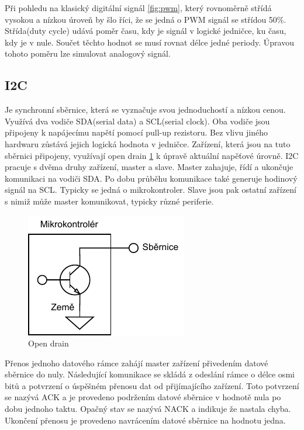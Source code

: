 Při pohledu na klasický digitální signál \ref{fig:pwm}, který rovnoměrně střídá vysokou a nízkou úroveň by šlo říci, že se jedná o PWM signál se střídou 50\%. Střída(duty cycle) udává poměr času, kdy je signál v logické jedničce, ku času, kdy je v nule. Součet těchto hodnot se musí rovnat délce jedné periody. Úpravou tohoto poměru lze simulovat analogový signál. \cite[str:~116-118]{embeded_robotics}

\newpage
\subsection*{I2C}
Je synchronní sběrnice, která se vyznačuje svou jednoduchostí a nízkou cenou. Využívá dva vodiče SDA(serial data) a SCL(serial clock). Oba vodiče jsou připojeny k napájecímu napětí pomocí pull-up rezistoru. Bez vlivu jiného hardwaru zůstává jejich logická hodnota v jedničce. Zařízení, která jsou na tuto sběrnici připojeny, využívají open drain \ref{fig:open_drain} k úpravě aktuální napěťové úrovně. I2C pracuje s dvěma druhy zařízení, master a slave. Master zahajuje, řídí a ukončuje komunikaci na vodiči SDA. Po dobu průběhu komunikace také generuje hodinový signál na SCL. Typicky se jedná o mikrokontroler. Slave jsou pak ostatní zařízení s nimiž může master komunikovat, typicky různé periferie. \cite[str:~88]{embeded_robotics}

\begin{figure}[h!]
	\centering
	\includegraphics[scale=1]{obrazky-figures/open_drain.pdf}
	\caption{Open drain}
	\label{fig:open_drain}
\end{figure}

Přenos jednoho datového rámce zahájí master zařízení přivedením datové sběrnice do nuly. Následující komunikace se skládá z odeslání rámce o délce osmi bitů a potvrzení o úspěšném přenosu dat od přijímajícího zařízení. Toto potvrzení se nazývá ACK a je provedeno podržením datové sběrnice v hodnotě nula po dobu jednoho taktu. Opačný stav se nazývá NACK a indikuje že nastala chyba. Ukončení přenosu je provedeno navrácením datové sběrnice na hodnotu jedna. \cite[str:~8-10]{um10204}

